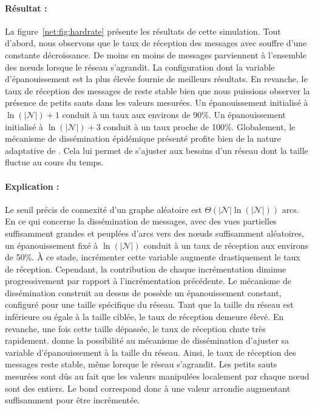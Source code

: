 \paragraph{Résultat :} La figure~\ref{net:fig:hardrate} présente les résultats
de cette simulation. Tout d'abord, nous observons que le taux de réception des
messages avec \CYCLON souffre d'une constante décroissance. De moins en moins de
messages parviennent à l'ensemble des nœuds lorsque le réseau s'agrandit. La
configuration dont la variable d'épanouissement est la plus élevée fournie de
meilleurs résultats. En revanche, le taux de réception des messages de \SPRAY
reste stable bien que nous puissions observer la présence de petits sauts dans
les valeurs mesurées. Un épanouissement initialisé à $\ln(|\mathcal{N}|)+1$
conduit à un taux aux environs de 90\%. Un épanouissement initialisé à
$\ln(|\mathcal{N}|)+3$ conduit à un taux proche de 100\%. Globalement, le
mécanisme de dissémination épidémique présenté profite bien de la nature
adaptative de \SPRAY. Cela lui permet de s'ajuster aux besoins d'un réseau dont
la taille fluctue au cours du temps.

\paragraph{Explication :} Le seuil précis de connexité d'un graphe aléatoire est
$\Theta(|\mathcal{N}|\ln(|\mathcal{N}|))$ arcs. En ce qui concerne la
dissémination de messages, avec des vues partielles suffisamment grandes et
peuplées d'arcs vers des nœuds suffisamment aléatoires, un épanouissement fixé à
$\ln(|\mathcal{N}|)$ conduit à un taux de réception aux environs de 50\%. À ce
stade, incrémenter cette variable augmente drastiquement le taux de
réception. Cependant, la contribution de chaque incrémentation diminue
progressivement par rapport à l'incrémentation précédente. Le mécanisme de
dissémination construit au dessus de \CYCLON possède un épanouissement constant,
configuré pour une taille spécifique du réseau. Tant que la taille du réseau est
inférieure ou égale à la taille ciblée, le taux de réception demeure élevé. En
revanche, une fois cette taille dépassée, le taux de réception chute très
rapidement. \SPRAY donne la possibilité au mécanisme de dissémination d'ajuster
sa variable d'épanouissement à la taille du réseau. Ainsi, le taux de réception
des messages reste stable, même lorsque le réseau s'agrandit. Les petits sauts
mesurées sont dûs au fait que les valeurs manipulées localement par chaque nœud
sont des entiers. Le bond correspond donc à une valeur arrondie augmentant
suffisamment pour être incrémentée.

